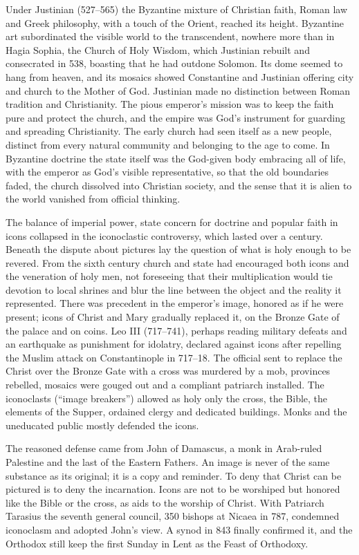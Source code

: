 Under Justinian (527--565) the Byzantine mixture of Christian faith, Roman law and Greek philosophy,
with a touch of the Orient, reached its height. Byzantine art subordinated the visible world to the
transcendent, nowhere more than in Hagia Sophia, the Church of Holy Wisdom, which Justinian rebuilt
and consecrated in 538, boasting that he had outdone Solomon. Its dome seemed to hang from heaven,
and its mosaics showed Constantine and Justinian offering city and church to the Mother of God.
Justinian made no distinction between Roman tradition and Christianity. The pious emperor's mission
was to keep the faith pure and protect the church, and the empire was God's instrument for guarding
and spreading Christianity. The early church had seen itself as a new people, distinct from every
natural community and belonging to the age to come. In Byzantine doctrine the state itself was the
God-given body embracing all of life, with the emperor as God's visible representative, so that the
old boundaries faded, the church dissolved into Christian society, and the sense that it is alien to
the world vanished from official thinking.

The balance of imperial power, state concern for doctrine and popular faith in icons collapsed in the
iconoclastic controversy, which lasted over a century. Beneath the dispute about pictures lay the
question of what is holy enough to be revered. From the sixth century church and state had encouraged
both icons and the veneration of holy men, not foreseeing that their multiplication would tie devotion
to local shrines and blur the line between the object and the reality it represented. There was
precedent in the emperor's image, honored as if he were present; icons of Christ and Mary gradually
replaced it, on the Bronze Gate of the palace and on coins. Leo III (717--741), perhaps reading
military defeats and an earthquake as punishment for idolatry, declared against icons after repelling
the Muslim attack on Constantinople in 717--18. The official sent to replace the Christ over the
Bronze Gate with a cross was murdered by a mob, provinces rebelled, mosaics were gouged out and a
compliant patriarch installed. The iconoclasts (``image breakers'') allowed as holy only the cross,
the Bible, the elements of the Supper, ordained clergy and dedicated buildings. Monks and the
uneducated public mostly defended the icons.

The reasoned defense came from John of Damascus, a monk in Arab-ruled Palestine and the last of the
Eastern Fathers. An image is never of the same substance as its original; it is a copy and reminder.
To deny that Christ can be pictured is to deny the incarnation. Icons are not to be worshiped but
honored like the Bible or the cross, as aids to the worship of Christ. With Patriarch Tarasius the
seventh general council, 350 bishops at Nicaea in 787, condemned iconoclasm and adopted John's view. A
synod in 843 finally confirmed it, and the Orthodox still keep the first Sunday in Lent as the Feast
of Orthodoxy.

